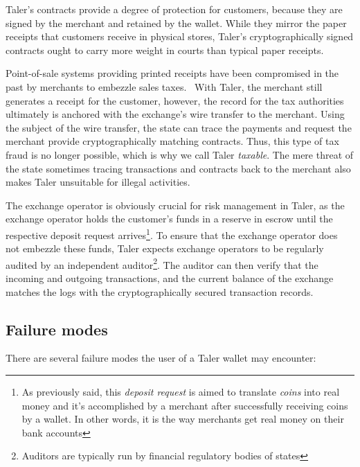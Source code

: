 \documentclass{llncs}
\begin{document}
Taler's contracts provide a degree of protection for customers,
because they are signed by the merchant and retained by the wallet.
While they mirror the paper receipts that customers receive in
physical stores, Taler's cryptographically signed contracts ought to
carry more weight in courts than typical paper receipts.

Point-of-sale systems providing printed receipts have been compromised
in the past by merchants to embezzle sales
taxes.~\cite{munichicecream} With Taler, the merchant still generates
a receipt for the customer, however, the record for the tax
authorities ultimately is anchored with the exchange's wire transfer
to the merchant.  Using the subject of the wire transfer, the state
can trace the payments and request the merchant provide
cryptographically matching contracts.  Thus, this type of tax
fraud is no longer possible, which is why we call Taler {\em
taxable}.  The mere threat of the state sometimes tracing transactions
and contracts back to the merchant also makes Taler unsuitable for
illegal activities.

The exchange operator is obviously crucial for risk management in
Taler, as the exchange operator holds the customer's funds in a
reserve in escrow until the respective deposit request arrives\footnote{As
previously said, this {\it deposit request} is aimed to translate {\it coins}
into real money and it's accomplished by a merchant after successfully
receiving coins by a wallet. In other words, it is the way merchants get
real money on their bank accounts}. To ensure that the exchange operator
does not embezzle these funds, Taler expects exchange operators to be
regularly audited by an independent auditor\footnote{Auditors are typically
run by financial regulatory bodies of states}.  The auditor can then verify that the incoming and outgoing
transactions, and the current balance of the exchange matches the logs
with the cryptographically secured transaction records.


\subsection{Failure modes}

There are several failure modes the user of a Taler wallet may
encounter:
\end{document}

